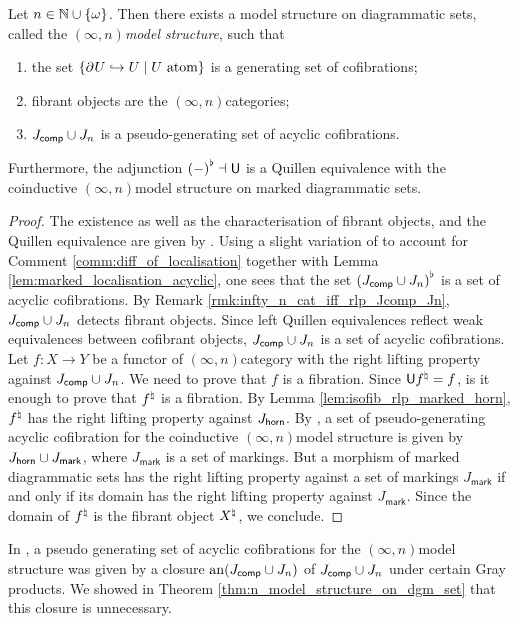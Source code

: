\begin{thm} \label{thm:n_model_structure_on_dgm_set}
    Let \( n \in \mathbb{N} \cup \left\{ {\omega} \right\} \).
    Then there exists a model structure on diagrammatic sets, called the \emph{\( (\infty, n) \)\nbd model structure}, such that
    \begin{enumerate}
        \item the set \( \left\{ {\partial_{}^{} U \hookrightarrow U \mid U \text{ atom}} \right\} \) is a generating set of cofibrations;
        \item fibrant objects are the \( (\infty, n) \)\nbd categories;
        \item \( J_{\mathsf{comp}} \cup J_{n} \) is a pseudo-generating set of acyclic cofibrations.
    \end{enumerate}
    Furthermore, the adjunction \( {(-)}^{\flat} \dashv \mathsf{U} \) is a Quillen equivalence with the coinductive \( (\infty, n) \)\nbd model structure on marked diagrammatic sets.
\end{thm}
\begin{proof}
    The existence as well as the characterisation of fibrant objects, and the Quillen equivalence are given by \cite[3.27, Theorem 4.21, Theorem 4.23]{chanavat2024model}.
    Using a slight variation of \cite[Lemma 4.16, Lemma 4.17]{chanavat2024model} to account for Comment \ref{comm:diff_of_localisation} together with Lemma \ref{lem:marked_localisation_acyclic}, one sees that the set \( {(J_{\mathsf{comp}} \cup J_{n})}^{\flat} \) is a set of acyclic cofibrations.
    By Remark \ref{rmk:infty_n_cat_iff_rlp_Jcomp_Jn}, \( J_{\mathsf{comp}} \cup J_{n} \) detects fibrant objects.
    Since left Quillen equivalences reflect weak equivalences between cofibrant objects, \( J_{\mathsf{comp}} \cup J_{n} \) is a set of acyclic cofibrations.
    Let \( f \colon X \to Y \) be a functor of \( (\infty, n) \)\nbd category with the right lifting property against \( J_{\mathsf{comp}} \cup J_{n} \).
    We need to prove that \( f \) is a fibration.
    Since \( \mathsf{U}{f}^{\natural} = f \), is it enough to prove that \( {f}^{\natural} \) is a fibration. 
    By Lemma \ref{lem:isofib_rlp_marked_horn}, \( {f}^{\natural} \) has the right lifting property against \( J_{\mathsf{horn}} \).
    By \cite[Theorem 4.22]{chanavat2025gray}, a set of pseudo-generating acyclic cofibration for the coinductive \( (\infty, n) \)\nbd model structure is given by \( J_{\mathsf{horn}} \cup J_{\mathsf{mark}} \), where \( J_{\mathsf{mark}} \) is a set of markings.
    But a morphism of marked diagrammatic sets has the right lifting property against a set of markings \( J_{\mathsf{mark}} \) if and only if its domain has the right lifting property against \( J_{\mathsf{mark}} \).
    Since the domain of \( {f}^{\natural} \) is the fibrant object \( {X}^{\natural} \), we conclude.
\end{proof}

\begin{comm}
    In \cite{chanavat2024model}, a pseudo generating set of acyclic cofibrations for the \( (\infty, n) \)\nbd model structure was given by a closure \( \mathrm{an}(J_{\mathsf{comp}} \cup J_{n}) \) of \( J_{\mathsf{comp}} \cup J_{n} \) under certain Gray products.
    We showed in Theorem \ref{thm:n_model_structure_on_dgm_set} that this closure is unnecessary.
\end{comm}

